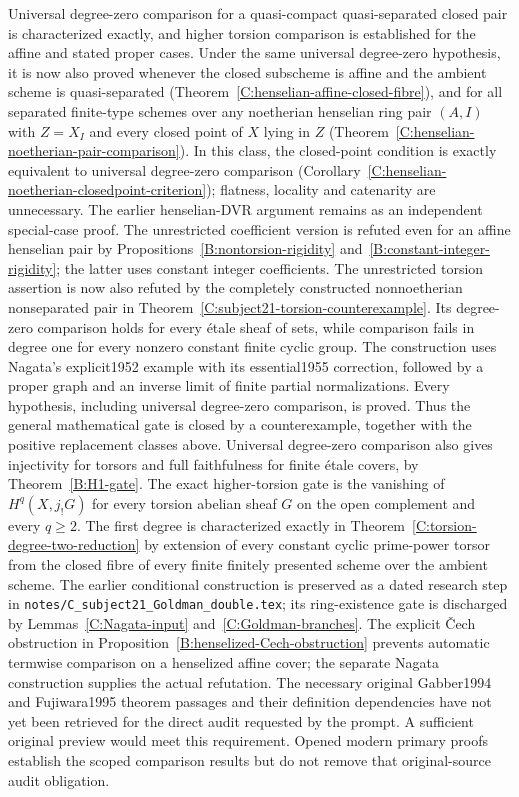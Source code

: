 \begin{question}
\label{U:henselian-comparison}
Universal degree-zero comparison for a quasi-compact quasi-separated
closed pair is characterized exactly, and higher torsion comparison is
established for the affine and stated proper cases. Under the same
universal degree-zero hypothesis, it is now also proved whenever the
closed subscheme is affine and the ambient scheme is
quasi-separated (Theorem~\ref{C:henselian-affine-closed-fibre}), and for
all separated finite-type schemes over any noetherian henselian ring
pair $(A,I)$ with $Z=X_I$ and every closed point of $X$ lying in $Z$
(Theorem~\ref{C:henselian-noetherian-pair-comparison}). In this class,
the closed-point condition is exactly equivalent to universal
degree-zero comparison
(Corollary~\ref{C:henselian-noetherian-closedpoint-criterion});
flatness, locality and catenarity are unnecessary. The earlier
henselian-DVR argument remains as an independent special-case proof.
The unrestricted
coefficient version is refuted even for an affine henselian pair by
Propositions~\ref{B:nontorsion-rigidity} and~\ref{B:constant-integer-rigidity};
the latter uses constant integer coefficients. The unrestricted torsion
assertion is now also refuted by the completely constructed
nonnoetherian nonseparated pair in
Theorem~\ref{C:subject21-torsion-counterexample}. Its degree-zero
comparison holds for every \'etale sheaf of sets, while comparison fails
in degree one for every nonzero constant finite cyclic group. The
construction uses Nagata's explicit1952 example with its essential1955
correction, followed by a proper graph and an inverse limit of finite
partial normalizations. Every hypothesis, including universal
degree-zero comparison, is proved. Thus the general mathematical gate
is closed by a counterexample, together with the positive replacement
classes above. Universal degree-zero
comparison also gives injectivity for torsors and full faithfulness for
finite \'etale covers, by Theorem~\ref{B:H1-gate}. The exact higher-torsion
gate is the vanishing of $H^q(X,j_!G)$ for every torsion abelian sheaf
$G$ on the open complement and every $q\ge2$.
The first degree is characterized exactly in
Theorem~\ref{C:torsion-degree-two-reduction} by extension of every
constant cyclic prime-power torsor from the closed fibre of every
finite finitely presented scheme over the ambient scheme.
The earlier conditional construction is preserved as a dated research
step in \texttt{notes/C\_subject21\_Goldman\_double.tex}; its ring-existence
gate is discharged by Lemmas~\ref{C:Nagata-input}
and~\ref{C:Goldman-branches}. The explicit \v Cech obstruction in
Proposition~\ref{B:henselized-Cech-obstruction} prevents automatic
termwise comparison on a henselized affine cover; the separate Nagata
construction supplies the actual refutation. The necessary original Gabber1994
and Fujiwara1995 theorem passages and their definition dependencies
have not yet been retrieved for the direct audit requested by the
prompt. A sufficient original preview would meet this requirement.
Opened modern primary proofs establish
the scoped comparison results but do not remove that original-source
audit obligation.
\end{question}

